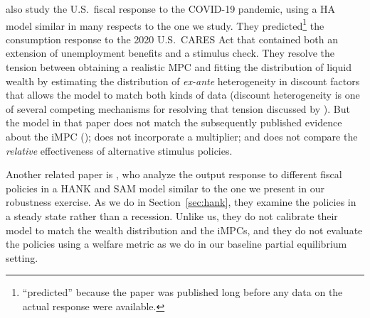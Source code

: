 \documentclass[\econtexRoot/HAFiscal]{subfiles}
\begin{document}
\cite{carroll2020modeling} also study the U.S.\ fiscal response to the COVID-19 pandemic, using a HA model similar in many respects to the one we study.  They predicted\footnote{``predicted'' because the paper was published long before any data on the actual response were available.} the consumption response to the 2020 U.S.\ CARES Act  that contained both an extension of unemployment benefits and a stimulus check.
They resolve the tension between obtaining a realistic MPC and fitting the distribution of liquid wealth by estimating the distribution of \textit{ex-ante} heterogeneity in discount factors that allows the model to match both kinds of data (discount heterogeneity is one of several competing mechanisms for resolving that tension discussed by \cite{kaplanMPC2022}).
But the model in that paper does not match the subsequently published evidence about the iMPC (\cite{fagereng_mpc_2021}); does not incorporate a multiplier; and does not compare the \textit{relative} effectiveness of alternative stimulus policies.

Another related paper is \cite{broer2025stimulus}, who analyze the output response to different fiscal policies in a HANK and SAM model similar to the one we present in our robustness exercise. As we do in Section~\ref{sec:hank}, they examine the policies in a steady state rather than a recession. Unlike us, they do not calibrate their model to match the wealth distribution and the iMPCs, and they do not evaluate the policies using a welfare metric as we do in our baseline partial equilibrium setting. 
\end{document}
